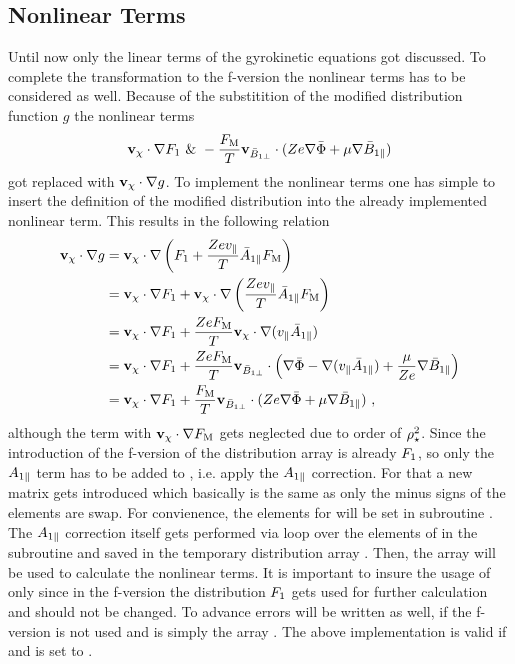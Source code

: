 \subsection{Nonlinear Terms}
\label{sub:implementationNonlinearTerms}

Until now only the linear terms of the gyrokinetic equations got discussed. To complete the transformation to the f-version \gkw the nonlinear terms has to be considered as well. Because of the substitition of the modified distribution function $g$ the nonlinear terms 
\begin{gather*}
    \boldsymbol{\mathbf{v}}_\chi \cdot \nabla F_1 ~ \& ~ -\frac{F_\mathrm{M}}{T} \boldsymbol{\mathbf{v}}_{\bar{B}_{1\perp}} \cdot (Z e \nabla \bar{\Phi} + \mu \nabla \bar{B}_{1\parallel})
    \label{eq:nonlinearTermsFVersion}
\end{gather*}
got replaced with $\boldsymbol{\mathbf{v}}_\chi \cdot \nabla g$. To implement the nonlinear terms one has simple to insert the definition of the modified distribution into the already implemented nonlinear term. This results in the following relation
\begin{gather}
    \begin{aligned}
        \boldsymbol{\mathbf{v}}_\chi \cdot \nabla g &= \boldsymbol{\mathbf{v}}_\chi \cdot \nabla \left(F_1 + \frac{Ze v_\parallel}{T} \bar{A}_{1\parallel} F_\mathrm{M}\right) \\
                             &= \boldsymbol{\mathbf{v}}_\chi \cdot \nabla F_1 + \boldsymbol{\mathbf{v}}_\chi \cdot \nabla \left(\frac{Ze v_\parallel}{T} \bar{A}_{1\parallel} F_\mathrm{M} \right) \\
                             &= \boldsymbol{\mathbf{v}}_\chi \cdot \nabla F_1 + \frac{Ze F_\mathrm{M}}{T} \boldsymbol{\mathbf{v}}_\chi \cdot \nabla (v_\parallel\bar{A}_{1\parallel}) \\
                             &= \boldsymbol{\mathbf{v}}_\chi \cdot \nabla F_1 + \frac{Ze F_\mathrm{M}}{T} \boldsymbol{\mathbf{v}}_{\bar{B}_{1\perp}} \cdot \left( \nabla \bar{\Phi} - \nabla (v_\parallel \bar{A}_{1\parallel}) + \frac{\mu}{Ze} \nabla \bar{B}_{1\parallel} \right) \\
                             &= \boldsymbol{\mathbf{v}}_\chi \cdot \nabla F_1 + \frac{F_\mathrm{M}}{T} \boldsymbol{\mathbf{v}}_{\bar{B}_{1\perp}} \cdot ( Ze \nabla \bar{\Phi} + \mu \nabla \bar{B}_{1\parallel}) ~,
    \end{aligned}
    \label{eq:nonlinearTermsGVersionToFVersion}
\end{gather}
although the term with $\boldsymbol{\mathbf{v}}_\chi \cdot \nabla F_\mathrm{M}$ gets neglected due to order of $\rho_\star^2$. Since the introduction of the f-version of \gkw the distribution array  is already $F_1$, so only the $A_{1\parallel}$ term has to be added to , i.e. apply the $A_{1\parallel}$ correction. For that a new matrix  gets introduced which basically is the same as  only the minus signs of the elements are swap. For convienence, the elements for  will be set in subroutine . The $A_{1\parallel}$ correction itself gets performed via loop over the elements of  in the subroutine  and saved in the temporary distribution array . Then, the array  will be used to calculate the nonlinear terms. It is important to insure the usage of  only since in the f-version the distribution $F_1$ gets used for further calculation and should not be changed. To advance errors  will be written as well, if the f-version is not used and is simply the array . The above implementation is valid if  and  is set to .

